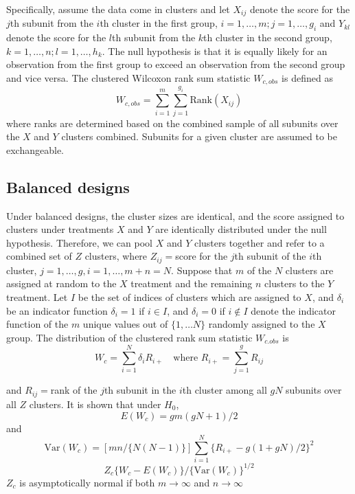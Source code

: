 \documentclass[article]{jss}
\begin{document}
Specifically, 
assume the data come in clusters and 
let $X_{ij}$ denote the score for the $j$th subunit
from the $i$th cluster in the first group, 
$i = 1,\ldots,m; j = 1,\ldots,g_i$ and $Y_{kl}$ 
denote the score for the $l$th subunit from 
the $k$th cluster in the second group,
$k=1, \ldots,n;l=1,\ldots,h_k$.
The null hypothesis is that it is 
equally likely for an observation from the 
first group to exceed an 
observation from the second group and vice versa.
The clustered Wilcoxon rank sum statistic 
$W_{c,obs}$ is defined as 
\begin{equation}
W_{c,obs} = \sum_{i=1}^m\sum_{j=1}^{g_i}\text{Rank}(X_{ij})
\end{equation}
where ranks are determined based on the
combined sample of all subunits over the
$X$ and $Y$ clusters combined. Subunits
for a given cluster are assumed to be exchangeable.


\subsection{Balanced designs}\label{bal}
Under balanced designs, the cluster sizes are identical, 
and
the score assigned to clusters under treatments
$X$ and $Y$ are
identically distributed under the null hypothesis. 
Therefore, we can pool $X$ and $Y$ clusters together and refer to a combined set of $Z$ clusters, where $Z_{ij} = $score for the $j$th subunit of the $i$th cluster, $j = 1,\ldots,g,i=1,\ldots,m+n = N$. Suppose that $m$ of the $N$ clusters are assigned at random to the $X$ treatment and the remaining $n$ clusters to the $Y$ treatment. Let $I$ be the 
set of indices of clusters which are assigned to $X$, and $\delta_i$ be
an indicator function
$\delta_i = 1$ if $i\in I$, and $\delta_i = 0$ if $i \not \in I$ denote the indicator function of the $m$ unique values out of $\{1, \ldots N\}$ randomly assigned to the $X$ group.  The distribution of the clustered rank sum statistic $W_{c.obs}$ is
\begin{equation}\label{eq:Wc}
W_c = \sum^N_{i=1}\delta_iR_{i+} \quad \text{where   }R_{i+} = \sum^g_{j=1}R_{ij}
\end{equation}

and $R_{ij}=$rank of the $j$th subunit in the $i$th cluster among all $gN$ subunits over all $Z$ clusters. It is shown that under $H_0$, 
\begin{equation}\label{eq:EWc}
E(W_c) = gm(gN + 1)/2
\end{equation}
and 
\begin{equation}\label{eq:VWc}
\text{Var}(W_c) = [mn/\{N(N-1)\}]\sum^N_{i=1}\{R_{i+} - g(1+gN)/2\}^2
\end{equation}
\begin{equation}
Z_c \{W_c - E(W_c)\}/\{\text{Var}(W_c)\}^{1/2}
\end{equation}
$Z_c$ is asymptotically normal if both $m \to \infty$ and $n \to \infty$
\end{document}
